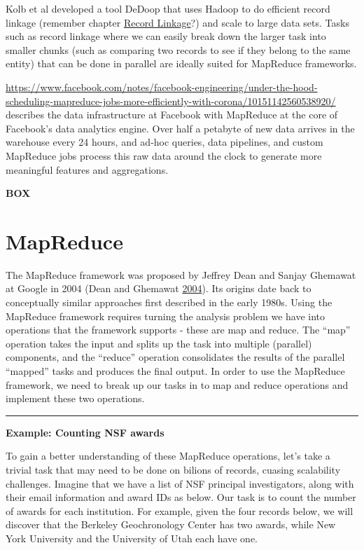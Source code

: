 \documentclass[]{krantz}
\begin{document}
Kolb et al developed a tool DeDoop that uses Hadoop to do efficient
record linkage (remember chapter \protect\hyperlink{chap:link}{Record
Linkage}?) and scale to large data sets. Tasks such as record linkage
where we can easily break down the larger task into smaller chunks (such
as comparing two records to see if they belong to the same entity) that
can be done in parallel are ideally suited for MapReduce frameworks.

\url{https://www.facebook.com/notes/facebook-engineering/under-the-hood-scheduling-mapreduce-jobs-more-efficiently-with-corona/10151142560538920/}
describes the data infrastructure at Facebook with MapReduce at the core
of Facebook's data analytics engine. Over half a petabyte of new data
arrives in the warehouse every 24 hours, and ad-hoc queries, data
pipelines, and custom MapReduce jobs process this raw data around the
clock to generate more meaningful features and aggregations.

\textbf{BOX}

\section{MapReduce}\label{sec:intro}

The MapReduce framework was proposed by Jeffrey Dean and Sanjay Ghemawat
at Google in 2004 (Dean and Ghemawat
\protect\hyperlink{ref-MapReduce}{2004}). Its origins date back to
conceptually similar approaches first described in the early 1980s.
Using the MapReduce framework requires turning the analysis problem we
have into operations that the framework supports - these are map and
reduce. The ``map'' operation takes the input and splits up the task
into multiple (parallel) components, and the ``reduce'' operation
consolidates the results of the parallel ``mapped'' tasks and produces
the final output. In order to use the MapReduce framework, we need to
break up our tasks in to map and reduce operations and implement these
two operations.

\begin{center}\rule{0.5\linewidth}{\linethickness}\end{center}

\textbf{Example: Counting NSF awards}

To gain a better understanding of these MapReduce operations, let's take
a trivial task that may need to be done on bilions of records, cuasing
scalability challenges. Imagine that we have a list of NSF principal
investigators, along with their email information and award IDs as
below. Our task is to count the number of awards for each institution.
For example, given the four records below, we will discover that the
Berkeley Geochronology Center has two awards, while New York University
and the University of Utah each have one.
\end{document}
